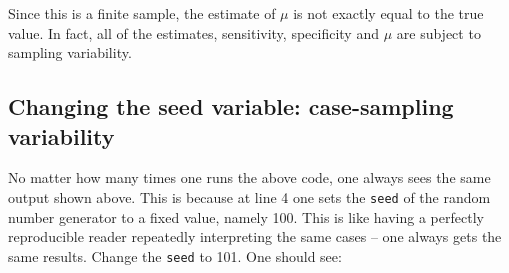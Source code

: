 \documentclass[
]{book}
\newenvironment{Shaded}{\begin{snugshade}}{\end{snugshade}}
\newcommand{\CommentTok}[1]{\textcolor[rgb]{0.56,0.35,0.01}{\textit{#1}}}
\newcommand{\DecValTok}[1]{\textcolor[rgb]{0.00,0.00,0.81}{#1}}
\newcommand{\FloatTok}[1]{\textcolor[rgb]{0.00,0.00,0.81}{#1}}
\newcommand{\FunctionTok}[1]{\textcolor[rgb]{0.00,0.00,0.00}{#1}}
\newcommand{\NormalTok}[1]{#1}
\newcommand{\OtherTok}[1]{\textcolor[rgb]{0.56,0.35,0.01}{#1}}
\newcommand{\SpecialCharTok}[1]{\textcolor[rgb]{0.00,0.00,0.00}{#1}}
\newcommand{\StringTok}[1]{\textcolor[rgb]{0.31,0.60,0.02}{#1}}
\begin{document}
\begin{Shaded}
\end{Shaded}

Since this is a finite sample, the estimate of \(\mu\) is not exactly equal to the true value. In fact, all of the estimates, sensitivity, specificity and \(\mu\) are subject to sampling variability.

\hypertarget{changing-the-seed-variable-case-sampling-variability}{%
\subsection{Changing the seed variable: case-sampling variability}\label{changing-the-seed-variable-case-sampling-variability}}

No matter how many times one runs the above code, one always sees the same output shown above. This is because at line 4 one sets the \texttt{seed} of the random number generator to a fixed value, namely 100. This is like having a perfectly reproducible reader repeatedly interpreting the same cases -- one always gets the same results. Change the \texttt{seed} to 101. One should see:
\end{document}
